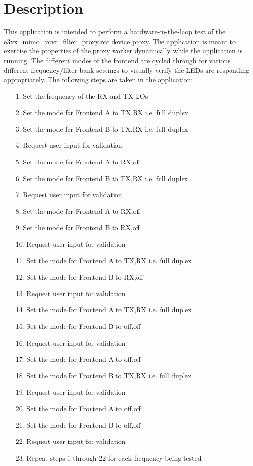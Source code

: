 \section{Description}
This application is intended to perform a hardware-in-the-loop test of the e3xx\_mimo\_xcvr\_filter\_proxy.rcc device proxy.
The application is meant to exercise the properties of the proxy worker dynamically while the application is running. The different modes of the frontend are cycled through for various different frequency/filter bank settings to visually verify the LEDs are responding appropriately. The following steps are taken in the application:
	\begin{itemize}
		\item[1.] Set the frequency of the RX and TX LOs
		\item[2.] Set the mode for Frontend A to TX,RX i.e. full duplex
		\item[3.] Set the mode for Frontend B to TX,RX i.e. full duplex
		\item[4.] Request user input for validation
		\item[5.] Set the mode for Frontend A to RX,off
		\item[6.] Set the mode for Frontend B to TX,RX i.e. full duplex
		\item[7.] Request user input for validation
		\item[8.] Set the mode for Frontend A to RX,off
		\item[9.] Set the mode for Frontend B to RX,off
		\item[10.] Request user input for validation
		\item[11.] Set the mode for Frontend A to TX,RX i.e. full duplex
		\item[12.] Set the mode for Frontend B to RX,off
		\item[13.] Request user input for validation
		\item[14.] Set the mode for Frontend A to TX,RX i.e. full duplex
		\item[15.] Set the mode for Frontend B to off,off
		\item[16.] Request user input for validation
		\item[17.] Set the mode for Frontend A to off,off
		\item[18.] Set the mode for Frontend B to TX,RX i.e. full duplex
		\item[19.] Request user input for validation
		\item[20.] Set the mode for Frontend A to off,off
		\item[21.] Set the mode for Frontend B to off,off
		\item[22.] Request user input for validation
		\item[23.] Repeat steps 1 through 22 for each frequency being tested
	\end{itemize}

